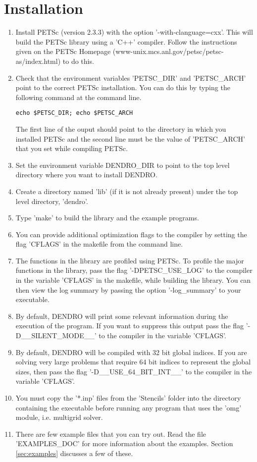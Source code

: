 \documentclass[12pt,reqno,a4paper]{report}
\numberwithin{equation}{section}
\begin{document}
\chapter{Installation}
\label{chp:install}
\begin{enumerate}
\item Install PETSc (version 2.3.3) with the option '-with-clanguage=cxx'.  This will build the PETSc library using a 'C++' compiler. Follow the instructions given on the PETSc Homepage (www-unix.mcs.anl.gov/petsc/petsc-as/index.html) to do this. 
\item Check that the environment variables 'PETSC\_DIR' and 'PETSC\_ARCH' point to the correct PETSc installation. You can do this by typing the following command at the command line.
\begin{verbatim}
echo $PETSC_DIR; echo $PETSC_ARCH
\end{verbatim} 
The first line of the ouput should point to the directory in which you installed PETSc and the second line must be the value of 'PETSC\_ARCH' that you set while compiling PETSc.
\item Set the environment variable DENDRO\_DIR to point to the top level directory where you want to install DENDRO. 
\item Create a directory named 'lib' (if it is not already present) under the top level directory, 'dendro'.
\item Type 'make' to build the library and the example programs. 
\item You can provide additional optimization flags to the compiler by setting the flag 'CFLAGS' in the makefile from the command line.
\item The functions in the library are profiled using PETSc. 
To profile the major functions in the library, pass the flag '-DPETSC\_USE\_LOG' to the compiler in the
variable 'CFLAGS' in the makefile, while building the library.
You can then view the log summary by passing the
 option '-log\_summary' to your executable.
 \item By default, DENDRO will print some relevant information during the execution of the program. If you want to suppress this output pass the flag '-D\_\_SILENT\_MODE\_\_' to the compiler in the variable 'CFLAGS'.
 \item By default, DENDRO will be compiled with 32 bit global indices. If you are solving very large problems that require 64 bit indices to represent the global sizes, then pass the flag '-D\_\_USE\_64\_BIT\_INT\_\_' to the compiler in the variable 'CFLAGS'.
 \item You must copy the '*.inp' files from the 'Stencils' folder into the directory containing the executable
before running any program that uses the 'omg' module, i.e. multigrid solver. 
\item There are few example files that you can try out. Read the file 'EXAMPLES\_DOC' for more information about the examples. Section \ref{sec:examples} discusses a few of these.
\end{enumerate}
\end{document}
